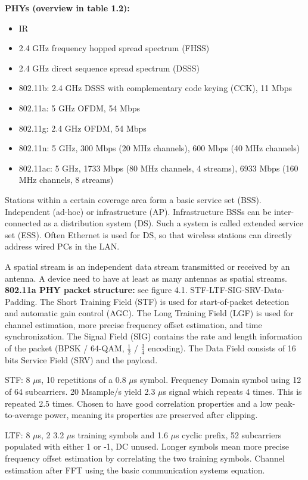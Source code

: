 \textbf{PHYs (overview in \cite{perahia2013} table 1.2):}

\begin{itemize}
	\item IR
	\item 2.4 GHz frequency hopped spread spectrum (FHSS)
	\item 2.4 GHz direct sequence spread spectrum (DSSS)
	\item 802.11b: 2.4 GHz DSSS with complementary code keying (CCK), 11 Mbps
	\item 802.11a: 5 GHz OFDM, 54 Mbps
	\item 802.11g: 2.4 GHz OFDM, 54 Mbps
	\item 802.11n: 5 GHz, 300 Mbps (20 MHz channels), 600 Mbps (40 MHz channels)
	\item 802.11ac: 5 GHz, 1733 Mbps (80 MHz channels, 4 streams), 6933 Mbps (160 MHz channels, 8 streams)
\end{itemize}

Stations within a certain coverage area form a basic service set (BSS). Independent (ad-hoc) or infrastructure (AP). Infrastructure BSSs can be inter-connected as a distribution system (DS). Such a system is called extended service set (ESS). Often Ethernet is used for DS, so that wireless stations can directly address wired PCs in the LAN.

A spatial stream is an independent data stream transmitted or received by an antenna. A device need to have at least as many antennas as spatial streams.\\

\textbf{802.11a PHY packet structure:} see \cite{perahia2013} figure 4.1. STF-LTF-SIG-SRV-Data-Padding. The Short Training Field (STF) is used for start-of-packet detection and automatic gain control (AGC). The Long Training Field (LGF) is used for channel estimation, more precise frequency offset estimation, and time synchronization. The Signal Field (SIG) contains the rate and length information of the packet (BPSK / 64-QAM, $\frac{1}{2}$ / $\frac{3}{4}$ encoding). The Data Field consists of 16 bits Service Field (SRV) and the payload.

STF: 8 $\mu$s, 10 repetitions of a 0.8 $\mu$s symbol. Frequency Domain symbol using 12 of 64 subcarriers. 20 Msample/s yield 2.3 $\mu$s signal which repeats 4 times. This is repeated 2.5 times. Chosen to have good correlation properties and a low peak-to-average power, meaning its properties are preserved after clipping.

LTF: 8 $\mu$s, 2 3.2 $\mu$s training symbols and 1.6 $\mu$s cyclic prefix, 52 subcarriers populated with either 1 or -1, DC unused. Longer symbols mean more precise frequency offset estimation by correlating the two training symbols. Channel estimation after FFT using the basic communication systems equation.

